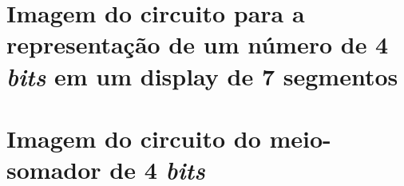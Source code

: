 
\begin{apendicesenv}

\partapendices

\chapter{Imagem do circuito para a representação de um número de 4 \textit{bits} em um display de 7 segmentos}
	\label{apendice:CircuitoEtapa1}
	

\chapter{Imagem do circuito do meio-somador de 4 \textit{bits}}
	



\end{apendicesenv}
